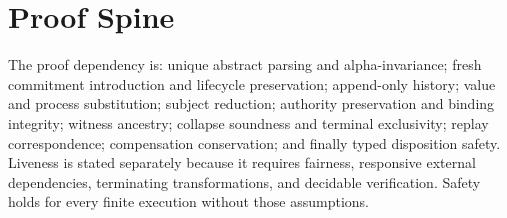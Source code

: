 \documentclass[11pt,openany]{book}
\theoremstyle{remark}
\begin{document}
\chapter{Proof Spine}

The proof dependency is: unique abstract parsing and alpha-invariance;
fresh commitment introduction and lifecycle preservation; append-only
history; value and process substitution; subject reduction; authority
preservation and binding integrity; witness ancestry; collapse soundness
and terminal exclusivity; replay correspondence; compensation
conservation; and finally typed disposition safety. Liveness is stated
separately because it requires fairness, responsive external dependencies,
terminating transformations, and decidable verification. Safety holds for
every finite execution without those assumptions.
\end{document}

